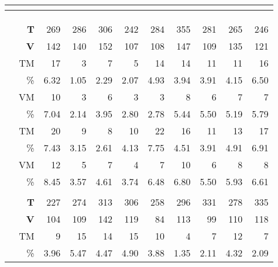 \begin{table}
    \centering
    \begin{ThreePartTable}  
    \begin{tabularx}{\textwidth}{L *{10}{R}}
     \\
    \toprule
    &  &  \\
    \toprule
    &  &  &  & & & & & & & \\
    \toprule
     \\
    \toprule
     & \textbf{T} &  269 & 286 & 306 & 242 & 284 & 355 & 281 & 265 & 246 \\
     & \textbf{V} & 142 & 140 & 152 & 107 & 108 & 147 & 109 & 135 & 121 \\
    \midrule
     & TM & 17 & 3 & 7 & 5 & 14 & 14 & 11 & 11 & 16 \\
     & \% & 6.32 & 1.05 & 2.29 & 2.07 & 4.93 & 3.94 & 3.91 & 4.15 & 6.50 \\
     & VM & 10 & 3 & 6 & 3 & 3 & 8 & 6 & 7 & 7 \\
     & \% & 7.04 & 2.14 & 3.95 & 2.80 & 2.78 & 5.44 & 5.50 & 5.19 & 5.79 \\
    \midrule
     & TM & 20 & 9 & 8 & 10 & 22 & 16 & 11 & 13 & 17 \\
     & \% & 7.43 & 3.15 & 2.61 & 4.13 & 7.75 & 4.51 & 3.91 & 4.91 & 6.91 \\
     & VM & 12 & 5 & 7 & 4 & 7 & 10 & 6 & 8 & 8 \\
     & \% & 8.45 & 3.57 & 4.61 & 3.74 & 6.48 & 6.80 & 5.50 & 5.93 & 6.61 \\
     \toprule
     \\
    \toprule
     & \textbf{T} & 227 & 274 & 313 & 306 & 258 & 296 & 331 & 278 & 335 \\
     & \textbf{V} & 104 & 109 & 142 & 119 & 84 & 113 & 99 & 110 & 118 \\
    \midrule
     & TM & 9 & 15 & 14 & 15 & 10 & 4 & 7 & 12 & 7 \\
     & \% & 3.96 & 5.47 & 4.47 & 4.90 & 3.88 & 1.35 & 2.11 & 4.32 & 2.09 \\

\end{tabularx}
\end{ThreePartTable}
\end{table}
